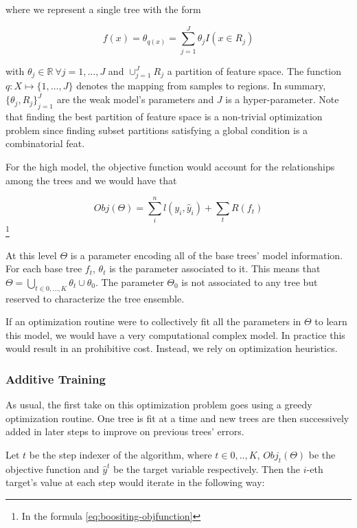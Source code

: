 where we represent a single tree with the form

\begin{equation}
f(x) = \theta_{q(x)} = \sum_{j=1}^J \theta_j I(x \in R_j)
\end{equation}

with $\theta_j \in \mathbb{R} \ \forall j = 1,\ldots,J$ and $ \cup_{j=1}^J R_j$ a partition of feature space. The function $q : X \mapsto \{1,\ldots,J\}$ denotes the mapping from samples to regions. In summary, ${\{\theta_j, R_j\}}_{j=1}^J$ are the weak model's parameters and $J$ is a hyper-parameter. Note that finding the best partition of feature space is a non-trivial optimization problem since finding subset partitions satisfying a global condition is a combinatorial feat.

For the high model, the objective function would account for the relationships among the trees and we would have that

\begin{equation}
Obj(\Theta) = \sum_i^n l(y_i,\hat{y}_i) + \sum_t R(f_t)
\end{equation}\label{eq:boositing-objfunction}\footnote{In the formula \cref{eq:boositing-objfunction} }

At this level $\Theta$ is a parameter encoding all of the base trees' model information. For each base tree $f_t$, $\theta_t$ is the parameter associated to it. This means that $\Theta = \bigcup_{t \in {0,\ldots,K}} \theta_t \cup \theta_0$. The parameter $\Theta_0$ is not associated to any tree but reserved to characterize the tree ensemble.

If an optimization routine were to collectively fit all the parameters in $\Theta$ to learn this model, we would have a very computational complex model. In practice this would result in an prohibitive cost. Instead, we rely on optimization heuristics.

\subsubsection{Additive Training}

As usual, the first take on this optimization problem goes using a greedy optimization routine. One tree is fit at a time and new trees are then successively added in later steps to improve on previous trees' errors.

Let $t$ be the step indexer of the algorithm, where $t \in {0,..,K}$, $Obj_t(\Theta)$ be the objective function and $\hat{y}^t$ be the target variable respectively. Then the $i$-eth target's value at each step would iterate in the following way:

